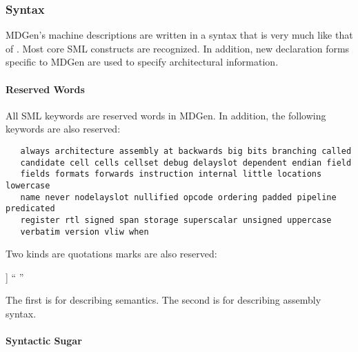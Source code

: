 \subsubsection{Syntax}

   MDGen's machine descriptions are written in a syntax that is very
much like that of 
. 
Most core SML constructs are recognized.  
In addition, new declaration forms specific to MDGen are 
used to specify architectural information.

\paragraph{Reserved Words}
   All SML keywords are reserved words in MDGen.
   In addition, the following keywords are also reserved:

\begin{verbatim}
   always architecture assembly at backwards big bits branching called
   candidate cell cells cellset debug delayslot dependent endian field
   fields formats forwards instruction internal little locations lowercase
   name never nodelayslot nullified opcode ordering padded pipeline predicated
   register rtl signed span storage superscalar unsigned uppercase 
   verbatim version vliw when
\end{verbatim}

   Two kinds are quotations marks are also reserved:   
\begin{SML}
   [[ ]]
   `` ''
\end{SML}

   The first \sml{[[ ]]} is for describing semantics.  The
second  is for describing assembly syntax.

\paragraph{Syntactic Sugar}

